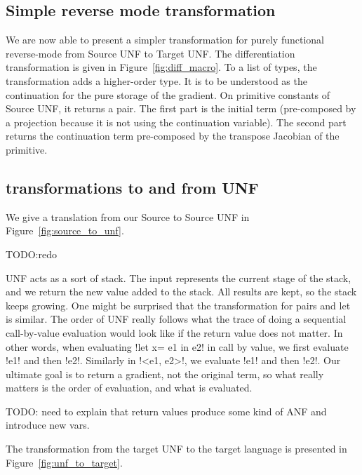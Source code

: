 



\subsection{Simple reverse mode transformation} %
\label{sub:Simple reverse mode transformation}

We are now able to present a simpler transformation for purely functional reverse-mode from Source UNF to Target UNF.
The differentiation transformation is given in Figure~\ref{fig:diff_macro}.
To a list of types, the transformation adds a higher-order type. 
It is to be understood as the continuation for the pure storage of the gradient.
On primitive constants of Source UNF, it returns a pair. 
The first part is the initial term (pre-composed by a projection because it is not using the continuation variable).
The second part returns the continuation term pre-composed by the transpose Jacobian of the primitive.



\subsection{transformations to and from UNF} %
\label{sub:transformations to and from UNF}

We give a translation from our Source to Source UNF in Figure~\ref{fig:source_to_unf}.

TODO:redo

UNF acts as a sort of stack. 
The input represents the current stage of the stack, and we return the new value added to the stack.
All results are kept, so the stack keeps growing. One might be surprised that the transformation for pairs and let is similar.
The order of UNF really follows what the trace of doing a sequential call-by-value evaluation would look like if the return value does not matter.
In other words, when evaluating !let x= e1 in e2! in call by value, we first evaluate !e1! and then !e2!. 
Similarly in !<e1, e2>!, we evaluate !e1! and then !e2!. 
Our ultimate goal is to return a gradient, not the original term, so what really matters is the order of evaluation, and what is evaluated.

TODO: need to explain that return values produce some kind of ANF and introduce new vars.



The transformation from the target UNF to the target language is presented in Figure~\ref{fig:unf_to_target}.



